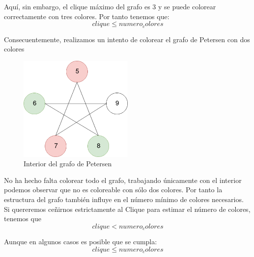 \documentclass{article}
\begin{document}
Aquí, sin embargo, el clique máximo del grafo es 3 y se puede colorear correctamente con tres colores. Por tanto tenemos que:
    \[clique \leq numero_colores\]
    
Consecuentemente, realizamos un intento de colorear el grafo de Petersen con dos colores 
\begin{figure}[H]
    \centering
    \includegraphics[width=0.5\textwidth]{pictures/interior.png}
    \caption{Interior del grafo de Petersen}
\end{figure}

No ha hecho falta colorear todo el grafo, trabajando únicamente con el interior podemos observar que no es coloreable con sólo dos colores.  
Por tanto la estructura del grafo también influye en el número mínimo de colores necesarios. Si quereremos ceñirnos estrictamente al Clique 
para estimar el número de colores, tenemos que 
    \[clique < numero_colores \] 

Aunque en algunos casos es posible que se cumpla: 
    \[clique \leq numero_colores\]
    
 

\end{document}
